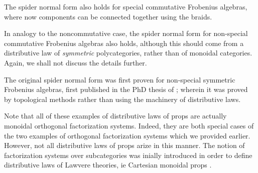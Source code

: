 \begin{remark}
The spider normal form also holds for special commutative Frobenius algebras, where now components can be connected together using the braids.


In analogy to the noncommutative case, the spider normal form  for non-special commutative Frobenius algebras also holds, although this should come from a distributive law of {\em symmetric} polycategories, rather than of monoidal categories.  Again, we shall not discuss the details further.


The original spider normal form was first proven for non-special symmetric Frobenius algebras, first published in the PhD thesis of \cite{spider}; wherein it was proved by topological methods rather than using the machinery of distributive laws.

\end{remark}

%
%

Note that all of these examples of distributive laws of props are actually  monoidal orthogonal factorization systems.  Indeed, they are both special cases of the two examples of orthogonal factorization systems which we provided earlier.   However, not all distributive laws of props arize in this manner. The notion of factorization systems over subcategories was inially introduced in order to define distributive laws of Lawvere theories, ie Cartesian monoidal props \cite{lawvere}.


